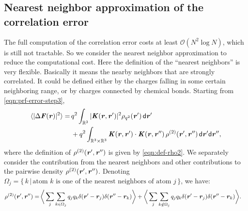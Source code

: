 \documentclass[journal=jacsat,manuscript=article]{achemso}
\newcommand{\recheck}[1]{{\color{black} #1}}
\newcommand{\redc}[1]{{\color{black} #1}}
\renewcommand{\v}[1]{\textbf{\textit{#1}}}
\renewcommand{\d}[1]{\textsf{#1}}
\begin{document}
\subsection{Nearest neighbor approximation of the correlation
error}
The full computation of the correlation error costs at least $\mathcal
O(N^2\log N)$, which is still not \redc{tractable}.
So we consider the nearest neighbor approximation to reduce
the computational cost.
Here the definition of the ``nearest neighbors'' is
very flexible. Basically it means the nearby neighbors that are
strongly correlated. It could be defined \recheck{either}
by the charges falling in some
certain neighboring range, or \recheck{by} charges connected by chemical bonds.
Starting from \ref{eqn:prf-error-step3},
\begin{align} \nonumber
  \langle\vert\Delta\v F(\v r)\vert^2\rangle
  =\,&
  q^2\int_{\mathbb R^3}
  \vert\v K(\v r , \v r')\vert^2\rho_{q^2}(\v r')\,\d d\v r'
  \\\label{eqn:start-corr}
  & +
  q^2\int_{\mathbb R^3\times\mathbb R^3}
  \v K(\v r , \v r')\cdot\v K(\v r , \v r'')\,
  \rho^{(2)}(\v r', \v r'')
  \,\d d\v r'\d d\v r'',
\end{align}
where the definition of $\rho^{(2)}(\v r', \v r'')$ is given by
\ref{eqn:def-rho2}.
We separately consider the  contribution from the nearest neighbors
and other contributions to
the pairwise density $\rho^{(2)}(\v r', \v r'')$.  Denoting
$\Omega_j = \{ \,k\,\vert\,
\textrm{atom $k$ is one of the nearest neighbors of atom $j$} \,\}$,
we have:
\begin{align}\label{eqn:split-rho-q2}
  \rho^{(2)}(\v r', \v r'')
  = &\,
  \bigg\langle
  \sum_j\sum_{k\in\Omega_j}q_j q_k\delta(\v r' - \v r_j)\delta(\v r'' - \v r_k)
  \bigg\rangle
  +
  \bigg\langle
  \sum_j\sum_{k\notin\Omega_j}q_j q_k\delta(\v r' - \v r_j)\delta(\v r'' - \v r_k)
  \bigg\rangle.
\end{align}
\end{document}
